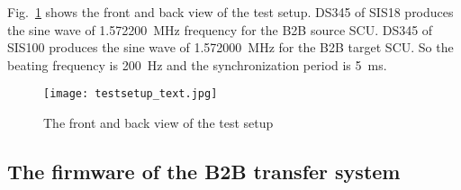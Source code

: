 Fig.~\ref{testsetup_text} shows the front and back view of the test setup. DS345 of SIS18 produces the sine wave of \SI{1.572200}{\MHz} frequency for the B2B source SCU. DS345 of SIS100 produces the sine wave of \SI{1.572000}{\MHz} for the B2B target SCU. So the beating frequency is \SI{200}{\Hz} and the synchronization period is \SI{5}{\ms}. 

\begin{figure}[!htb]
   \centering   
   \texttt{[image: testsetup\_text.jpg]}
   \caption{The front and back view of the test setup}
   \label{testsetup_text}
\end{figure}

\subsection{The firmware of the B2B transfer system}

